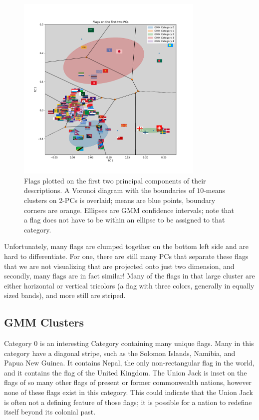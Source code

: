\documentclass[11pt]{amsart}
\newcommand{\todo}[1]{\textcolor{red}{TODO: #1}}
\begin{document}
\begin{figure}[!ht]
    \centering
    \includegraphics[width=0.8\textwidth]{./res/flags-kmeans-gmm.pdf}
    \caption{Flags plotted on the first two principal components of their
    descriptions. A Voronoi diagram with the boundaries of \(10\)-means clusters
    on 2-PCs is overlaid; means are blue points, boundary corners are orange.
    Ellipses are GMM confidence intervals; note that a flag does not have to be
    within an ellipse to be assigned to that category.\label{fig:flag-pca}}
\end{figure}


Unfortunately, many flags are clumped together on the bottom left side and are
hard to differentiate. For one, there are still many PCs that separate these
flags that we are not visualizing that are projected onto just two dimension,
and secondly, many flags are in fact similar! Many of the flags in that large
cluster are either horizontal or vertical tricolors (a flag with three colors,
generally in equally sized bands), and more still are striped.

\subsection*{GMM Clusters}

Category 0 is an interesting Category containing many unique flags. Many in this
category have a diagonal stripe, such as the Solomon Islands, Namibia, and Papua
New Guinea. It contains Nepal, the only non-rectangular flag in the world, and
it contains the flag of the United Kingdom. The Union Jack is inset on the flags
of so many other flags of present or former commonwealth nations, however none
of these flags exist in this category. This could indicate that the Union Jack
is often not a defining feature of those flags; it is possible for a nation to
redefine itself beyond its colonial past.
\end{document}
